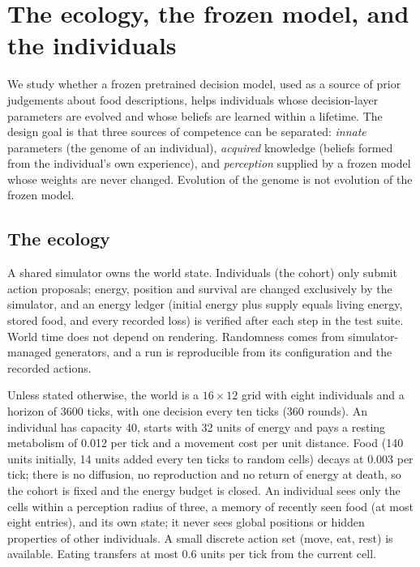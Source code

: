 \section{The ecology, the frozen model, and the individuals}
\label{sec:methods}

We study whether a frozen pretrained decision model, used as a source of prior judgements about food descriptions, helps individuals whose decision-layer parameters are evolved and whose beliefs are learned within a lifetime. The design goal is that three sources of competence can be separated: \emph{innate} parameters (the genome of an individual), \emph{acquired} knowledge (beliefs formed from the individual's own experience), and \emph{perception} supplied by a frozen model whose weights are never changed. Evolution of the genome is not evolution of the frozen model.

\subsection{The ecology}
\label{sec:ecology}
A shared simulator owns the world state. Individuals (the cohort) only submit action proposals; energy, position and survival are changed exclusively by the simulator, and an energy ledger (initial energy plus supply equals living energy, stored food, and every recorded loss) is verified after each step in the test suite. World time does not depend on rendering. Randomness comes from simulator-managed generators, and a run is reproducible from its configuration and the recorded actions.

Unless stated otherwise, the world is a $16\times 12$ grid with eight individuals and a horizon of 3600 ticks, with one decision every ten ticks (360 rounds). An individual has capacity 40, starts with 32 units of energy and pays a resting metabolism of 0.012 per tick and a movement cost per unit distance. Food (140 units initially, 14 units added every ten ticks to random cells) decays at 0.003 per tick; there is no diffusion, no reproduction and no return of energy at death, so the cohort is fixed and the energy budget is closed. An individual sees only the cells within a perception radius of three, a memory of recently seen food (at most eight entries), and its own state; it never sees global positions or hidden properties of other individuals. A small discrete action set (move, eat, rest) is available. Eating transfers at most 0.6 units per tick from the current cell.

